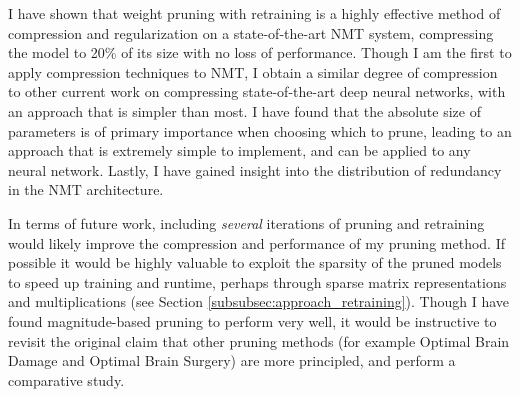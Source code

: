 I have shown that weight pruning with retraining is a highly effective method of compression and regularization on a state-of-the-art NMT system, compressing the model to 20\% of its size with no loss of performance. 
Though I am the first to apply compression techniques to NMT, I obtain a similar degree of compression to other current work on compressing state-of-the-art deep neural networks, with an approach that is simpler than most.
I have found that the absolute size of parameters is of primary importance when choosing which to prune, leading to an approach that is extremely simple to implement, and can be applied to any neural network.
Lastly, I have gained insight into the distribution of redundancy in the NMT architecture.

In terms of future work, including \emph{several} iterations of pruning and retraining would likely improve the compression and performance of my pruning method.
If possible it would be highly valuable to exploit the sparsity of the pruned
models to speed up training and runtime, perhaps through sparse matrix
representations and multiplications (see Section \ref{subsubsec:approach_retraining}).
Though I have found magnitude-based pruning to perform very well, it would be instructive to revisit the original claim that other pruning methods (for example Optimal Brain Damage and Optimal Brain Surgery) are more principled, and perform a comparative study.



